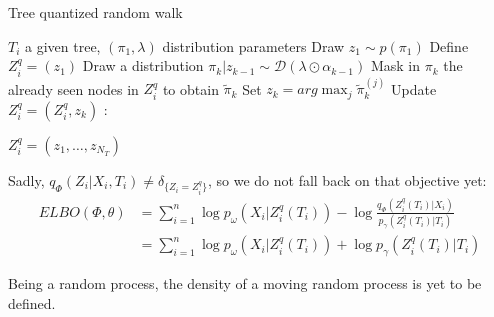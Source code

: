 \begin{algorithm}[H]
    \caption{Tree quantized random walk}
    \begin{algorithmic}
        \REQUIRE $T_i$ a given tree, $(\pi_1, \lambda)$ distribution parameters
        \STATE Draw $z_{1} \sim p(\pi_1)$
        \STATE Define $Z_i^q = (z_{1})$
            \STATE \quad Draw a distribution $\pi_{k} | z_{k-1} \sim \mathcal{D}(\lambda \odot \alpha_{k-1})$
            \STATE \quad Mask in $\pi_{k}$ the already seen nodes in $Z_i^q$ to obtain $\tilde{\pi}_{k}$
            \STATE \quad Set $z_{k} = arg\max_{j} \tilde{\pi}_{k}^{(j)}$
            \STATE \quad Update $Z_i^q = (Z_i^q, z_k)$
        \EndFor:

        \RETURN{} $Z_i^q = (z_1, \dots, z_{N_T})$
    \end{algorithmic}

    \label{alg:tree_quantized_walk}
\end{algorithm}

Sadly, $q_{\Phi}(Z_i|X_i,T_i) \neq \delta_{\{Z_i = Z_i^q\}}$, so we do not fall back on that objective yet:
$$
\begin{align}
    ELBO(\Phi, \theta) &= \sum_{i=1}^n \log p_{\omega}(X_i | Z_i^q(T_i)) - \log \frac{q_{\Phi}(Z_i^q(T_i) | X_i)}{p_{\gamma}(Z_i^q (T_i) | T_i)} \\
    &= \sum_{i=1}^n \log p_{\omega}(X_i | Z_i^q(T_i)) + \log p_{\gamma}(Z_i^q (T_i) | T_i)
\end{align}
$$

Being a random process, the density of a moving random process is yet to be defined.